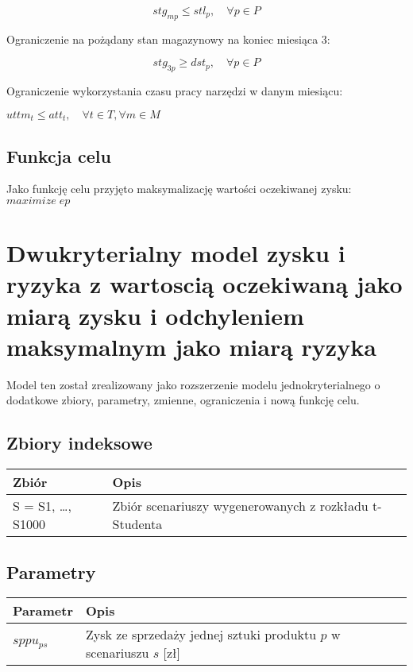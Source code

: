 \documentclass[12pt]{article}
\begin{document}
$$stg_{mp} \leqslant stl_p, \quad \forall p \in P$$

Ograniczenie na pożądany stan magazynowy na koniec miesiąca 3:

$$stg_{3p} \geqslant dst_p, \quad \forall p \in P$$

Ograniczenie wykorzystania czasu pracy narzędzi w danym miesiącu:

$uttm_t \leq att_t, \quad \forall t \in T, \forall m \in M$

\subsection{Funkcja celu}

Jako funkcję celu przyjęto maksymalizację wartości oczekiwanej zysku: $maximize \; ep$

\section{Dwukryterialny model zysku i ryzyka z wartoscią oczekiwaną jako miarą zysku i odchyleniem maksymalnym jako miarą ryzyka}

Model ten został zrealizowany jako rozszerzenie modelu jednokryterialnego o dodatkowe zbiory, parametry, zmienne, ograniczenia i nową funkcję celu.

\subsection{Zbiory indeksowe}

\begin{table}[h!]
\centering
\begin{tabular}{|l|l|}
\hline
Zbiór & Opis \\
\hline
S = S1, \ldots, S1000 & Zbiór scenariuszy wygenerowanych z rozkładu t-Studenta \\
\hline
\end{tabular}
\end{table}

\subsection{Parametry}

\begin{table}[h!]
\centering
\begin{tabular}{|l|l|}
\hline
Parametr & Opis \\
\hline
$sppu_{ps}$ & Zysk ze sprzedaży jednej sztuki produktu $p$ w scenariuszu $s$ [zł] \\
\hline
\end{tabular}
\end{table}
\end{document}
